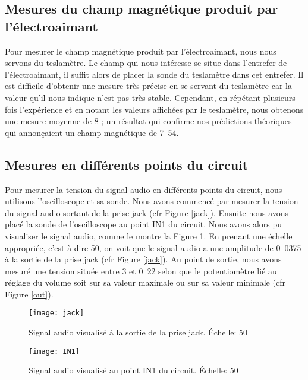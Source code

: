 \subsection{Mesures du champ magnétique produit par l'électroaimant}
Pour mesurer le champ magnétique produit par l'électroaimant, nous nous servons du teslamètre.
Le champ qui nous intéresse se situe dans l'entrefer de l'électroaimant, il suffit alors de placer
la sonde du teslamètre dans cet entrefer. Il est difficile d'obtenir une mesure très précise en se
servant du teslamètre car la valeur qu'il nous indique n'est pas très stable. Cependant, en répétant
plusieurs fois l'expérience et en notant les valeurs affichées par le teslamètre, nous obtenons une mesure
moyenne de \unit{8}{\centi\tesla} ; un résultat qui confirme nos prédictions théoriques
qui annonçaient un champ magnétique de \unit{7.54}{\centi\tesla}.

\subsection{Mesures en différents points du circuit}
Pour mesurer la tension du signal audio en différents points du circuit, nous utilisons l'oscilloscope
et sa sonde.
Nous avons commencé par mesurer la tension du signal audio sortant de la prise jack (cfr Figure \ref{jack}). Ensuite nous avons
placé la sonde de l'oscilloscope au point IN1 du circuit. Nous avons alors pu visualiser le
signal audio, comme le montre la Figure \ref{in1}.
En prenant une échelle appropriée, c'est-à-dire \unit{50}{\milli\volt}, on voit que le signal
audio a une amplitude de \unit{0.0375}{\volt} à la sortie de la prise jack (cfr Figure \ref{jack}).
Au point de sortie, nous avons mesuré une tension située entre \unit{3}{\volt}
et \unit{0.22}{\volt} selon que le potentiomètre lié au réglage du volume
soit sur sa valeur maximale ou sur sa valeur minimale (cfr Figure \ref{out}).


\begin{figure}[h]
\begin{minipage}[c]{.45\linewidth}
\begin{center}
\texttt{[image: jack]}
\caption{Signal audio visualisé à la sortie de la prise jack. Échelle: \unit{50}{\milli\volt}}
\label{jack}
\end{center}
\end{minipage}
\hfill
\begin{minipage}[c]{.45\linewidth}
\begin{center}
\texttt{[image: IN1]}
\caption{Signal audio visualisé au point IN1 du circuit. Échelle: \unit{50}{\milli\volt}}
\label{in1}
\end{center}
\end{minipage}
\end{figure}


